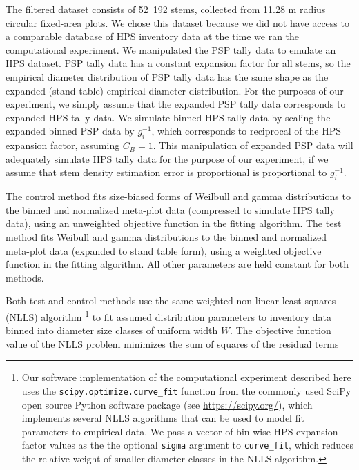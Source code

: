 \message{ !name(hpsdistfit_article.tex)}\documentclass{article}
\begin{document}
The filtered dataset consists of 52~192 stems, collected from 11.28 m
radius circular fixed-area plots.
We chose this dataset because we did not have access to a comparable
database of HPS inventory data at the time we ran the computational
experiment. We manipulated the PSP tally data to emulate an HPS dataset.
PSP tally data has a constant expansion factor for all stems, so the empirical diameter distribution of PSP tally data has the same shape as the expanded (stand table) empirical diameter distribution. 
For the purposes of our experiment, we simply assume that the expanded PSP tally data corresponds to expanded HPS tally data. 
We simulate binned HPS tally data by scaling the expanded binned PSP data by $g_i^{-1}$, which corresponds to reciprocal of the HPS expansion factor, assuming $C_B = 1$. 
This manipulation of expanded PSP data will adequately simulate HPS
tally data for the purpose of our experiment, if we assume that stem density estimation error is proportional is proportional to $g_i^{-1}$.

The control method fits size-biased forms of Weilbull and gamma
distributions to the binned and normalized meta-plot data (compressed to simulate HPS tally data), using an unweighted objective function in the fitting algorithm.
The test method fits Weibull and gamma distributions to the binned and
normalized meta-plot data (expanded to stand table form), using a weighted objective function in the fitting algorithm.
All other parameters are held constant for both methods.


Both test and control methods use the same weighted non-linear least
squares (NLLS) algorithm
 \footnote{Our software implementation of the
   computational experiment described here uses the \texttt{scipy.optimize.curve\_fit}
   function from the commonly used SciPy open source Python software
   package (see \url{https://scipy.org/}), which implements several NLLS
   algorithms that can be used to model fit parameters to empirical
   data. We pass a vector of bin-wise HPS expansion factor values as
   the the optional \texttt{sigma} argument to
   \texttt{curve\_fit}, which reduces the relative weight of smaller
   diameter classes in the NLLS algorithm.}
to fit assumed distribution parameters to inventory data binned into
diameter size classes of uniform width $W$.
The objective function value of the NLLS problem minimizes the sum of
squares of the residual terms
\end{document}
